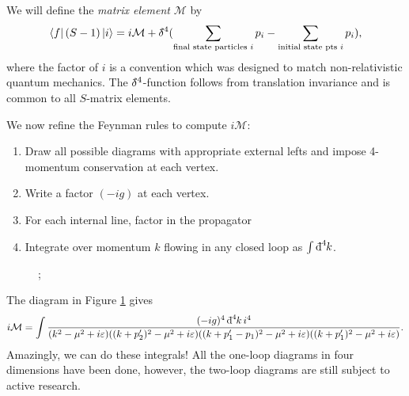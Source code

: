 \begin{definition}[]
  We will define the \emph{matrix element} $\mathcal{M}$ by 
  \begin{equation}
    \bra{f} (S-1) \ket{i} = i \mathcal{M} + \bdelta^4 (\sum_{\text{final state particles } i} p_i - \sum_{\text{initial state pts } i} p_i),
  \end{equation}
  where the factor of $i$ is a convention which was designed to match non-relativistic quantum mechanics. The $\bdelta^4$-function follows from translation invariance and is common to all $S$-matrix elements.
\end{definition}

We now refine the Feynman rules to compute $i \mathcal{M}$:
\begin{enumerate}
  \item Draw all possible diagrams with appropriate external lefts and impose 4-momentum conservation at each vertex.
  \item Write a factor $(-ig)$ at each vertex.
  \item For each internal line, factor in the propagator
  \item Integrate over momentum $k$ flowing in any closed loop as $\int \bdd[4]{k}$.
\end{enumerate}

\begin{example}[$\phi \phi \to \phi \phi$]
  \begin{figure}[htbp]
    \centering
    ;
    \caption{}
    \label{fig:}
  \end{figure}
  The diagram in Figure \ref{fig:} gives
  \begin{equation}
    i \mathcal{M} = \int \frac{(-ig)^4 \bdd[4]{k} i^4}{(k^2 - \mu^2 + i\varepsilon) ((k + p'_2)^2 - \mu^2 + i \varepsilon) ((k + p_1' - p_1)^2 - \mu^2 + i\varepsilon)((k+p_1')^2 - \mu^2 + i\varepsilon)}.
  \end{equation}
  Amazingly, we can do these integrals!
  All the one-loop diagrams in four dimensions have been done, however, the two-loop diagrams are still subject to active research.
  
\end{example}
